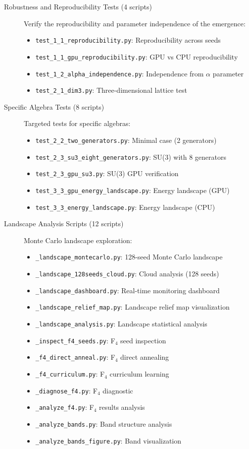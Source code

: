 \begin{description}
\item[Robustness and Reproducibility Tests (4 scripts)] Verify the reproducibility and parameter independence of the emergence:
\begin{itemize}
\item \texttt{test\_1\_1\_reproducibility.py}: Reproducibility across seeds
\item \texttt{test\_1\_1\_gpu\_reproducibility.py}: GPU vs CPU reproducibility
\item \texttt{test\_1\_2\_alpha\_independence.py}: Independence from $\alpha$ parameter
\item \texttt{test\_2\_1\_dim3.py}: Three-dimensional lattice test
\end{itemize}

\item[Specific Algebra Tests (8 scripts)] Targeted tests for specific algebras:
\begin{itemize}
\item \texttt{test\_2\_2\_two\_generators.py}: Minimal case (2 generators)
\item \texttt{test\_2\_3\_su3\_eight\_generators.py}: SU(3) with 8 generators
\item \texttt{test\_2\_3\_gpu\_su3.py}: SU(3) GPU verification
\item \texttt{test\_3\_3\_gpu\_energy\_landscape.py}: Energy landscape (GPU)
\item \texttt{test\_3\_3\_energy\_landscape.py}: Energy landscape (CPU)
\end{itemize}

\item[Landscape Analysis Scripts (12 scripts)] Monte Carlo landscape exploration:
\begin{itemize}
\item \texttt{\_landscape\_montecarlo.py}: 128-seed Monte Carlo landscape
\item \texttt{\_landscape\_128seeds\_cloud.py}: Cloud analysis (128 seeds)
\item \texttt{\_landscape\_dashboard.py}: Real-time monitoring dashboard
\item \texttt{\_landscape\_relief\_map.py}: Landscape relief map visualization
\item \texttt{\_landscape\_analysis.py}: Landscape statistical analysis
\item \texttt{\_inspect\_f4\_seeds.py}: F$_4$ seed inspection
\item \texttt{\_f4\_direct\_anneal.py}: F$_4$ direct annealing
\item \texttt{\_f4\_curriculum.py}: F$_4$ curriculum learning
\item \texttt{\_diagnose\_f4.py}: F$_4$ diagnostic
\item \texttt{\_analyze\_f4.py}: F$_4$ results analysis
\item \texttt{\_analyze\_bands.py}: Band structure analysis
\item \texttt{\_analyze\_bands\_figure.py}: Band visualization
\end{itemize}


\end{description}
